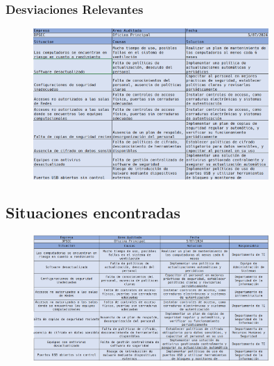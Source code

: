 \documentclass[12pt,a4paper]{article}
\begin{document}
\subsubsection*{Desviaciones Relevantes}
\begin{figure}[!htb]
    \centering
    \includegraphics[width=0.8\textwidth]{images/desviaciones.png}
    
\end{figure} 

\subsection{Situaciones encontradas}
\begin{figure}[!htb]
    \centering
    \includegraphics[width=0.8\textwidth]{images/responsable.png}
    
\end{figure} 
\FloatBarrier 
\end{document}
